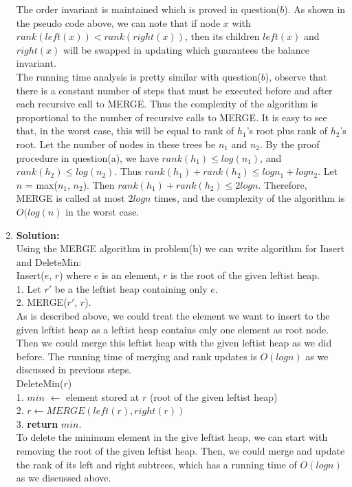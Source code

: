 \begin{enumerate}[label=(\alph*)]
	The order invariant is maintained which is proved in question($b$). As shown in the pseudo code above, we can note that if node $x$ with $rank(left(x)) < rank(right(x))$, then its children $left(x)$ and $right(x)$ will be swapped in updating which guarantees the balance invariant.\\

	The running time analysis is pretty similar with question($b$), observe that there is a constant number of steps that must be executed before and after each recursive call to MERGE. Thus the complexity of the algorithm is proportional to the number of recursive calls to MERGE.  It is easy to see that, in the worst case, this will be equal to rank of $h_1$'s root plus rank of $h_2$'s root. Let the number of nodes in these trees be $n_1$ and $n_2$. By the proof procedure in question(a), we have $rank(h_1) \leq log(n_1)$, and $rank(h_2) \leq log(n_2)$. Thus $rank(h_1) + rank(h_2) \leq logn_1 + logn_2$. Let $n$ = max($n_1$, $n_2$). Then $rank(h_1) + rank(h_2) \leq 2logn$. Therefore, MERGE is called at most $2logn$ times, and the complexity of the algorithm is $O(log(n)$ in the worst case. \\

	\item \textbf{Solution:} \\
	Using the MERGE algorithm in problem(b) we can write algorithm for Insert and DeleteMin:\\

	Insert($e$, $r$) where $e$ is an element, $r$ is the root of the given leftist heap.\\

	1. Let $r'$ be a the leftist heap containing only $e$.\\
	2. MERGE($r'$, $r$).\\

	As is described above, we could treat the element we want to insert to the given leftist heap as a leftist heap contains only one element as root node. Then we could merge this leftist heap with the given leftist heap as we did before. The running time of merging and rank updates is $O(logn)$ as we discussed in previous steps.\\

	DeleteMin($r$)\\

	1. $min$ $\gets$ element stored at $r$ (root of the given leftist heap)\\
	2. $r \gets MERGE(left(r), right(r))$\\
	3. \textbf{return} $min$.\\

	To delete the minimum element in the give leftist heap, we can start with removing the root of the given leftist heap. Then, we could merge and update the rank of its left and right subtrees, which has a running time of $O(logn)$ as we discussed above. 

\end{enumerate}